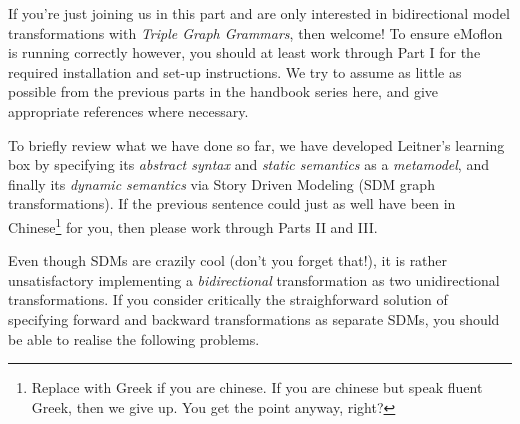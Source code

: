 \genHeader
\label{chap:Learning-Box-to-Dictionary-and-Back-Again}


If you're just joining us in this part and are only interested in bidirectional model transformations with \emph{Triple Graph Grammars}, then welcome!
To ensure eMoflon is running correctly however, you should at least work through Part I for the required installation and set-up instructions. We try to assume
as little as possible from the previous parts in the handbook series here, and give appropriate references where necessary.

To briefly review what we have done so far, we have developed Leitner's learning box by specifying its \emph{abstract syntax} and \emph{static
semantics} as a \emph{metamodel}, and finally its \emph{dynamic semantics} via Story Driven Modeling (SDM graph transformations). If the previous sentence could
just as well have been in Chinese\footnote{Replace with Greek if you are chinese.  If you are chinese but speak fluent Greek, then we give up. You get the point
anyway, right?} for you, then please work through Parts II and III.

Even though SDMs are crazily cool (don't you forget that!), it is rather unsatisfactory implementing a \emph{bidirectional}
transformation as two unidirectional transformations. If you consider critically the straighforward solution of specifying forward and backward
transformations as separate SDMs, you should be able to realise the following problems.

